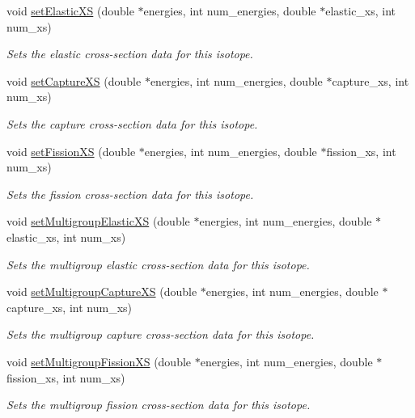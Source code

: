 \begin{DoxyCompactItemize}
void \hyperlink{classIsotope_a7916d1aa6ff21cdc92bf7d50fe007ab3}{set\-Elastic\-X\-S} (double $\ast$energies, int num\-\_\-energies, double $\ast$elastic\-\_\-xs, int num\-\_\-xs)
\begin{DoxyCompactList}\small\item\em Sets the elastic cross-\/section data for this isotope. \end{DoxyCompactList}\item 
void \hyperlink{classIsotope_ababa83f3f6499084769e5cc4dbb34746}{set\-Capture\-X\-S} (double $\ast$energies, int num\-\_\-energies, double $\ast$capture\-\_\-xs, int num\-\_\-xs)
\begin{DoxyCompactList}\small\item\em Sets the capture cross-\/section data for this isotope. \end{DoxyCompactList}\item 
void \hyperlink{classIsotope_ac8268351aeb8d8d321935386fbfae45b}{set\-Fission\-X\-S} (double $\ast$energies, int num\-\_\-energies, double $\ast$fission\-\_\-xs, int num\-\_\-xs)
\begin{DoxyCompactList}\small\item\em Sets the fission cross-\/section data for this isotope. \end{DoxyCompactList}\item 
void \hyperlink{classIsotope_a9e6a5d6c881814415769038b288189cc}{set\-Multigroup\-Elastic\-X\-S} (double $\ast$energies, int num\-\_\-energies, double $\ast$elastic\-\_\-xs, int num\-\_\-xs)
\begin{DoxyCompactList}\small\item\em Sets the multigroup elastic cross-\/section data for this isotope. \end{DoxyCompactList}\item 
void \hyperlink{classIsotope_ab1938f4ecfa23a73ab995626a28b9393}{set\-Multigroup\-Capture\-X\-S} (double $\ast$energies, int num\-\_\-energies, double $\ast$capture\-\_\-xs, int num\-\_\-xs)
\begin{DoxyCompactList}\small\item\em Sets the multigroup capture cross-\/section data for this isotope. \end{DoxyCompactList}\item 
void \hyperlink{classIsotope_ae642cf07eaeeb65ddddbb91f00b5b4d7}{set\-Multigroup\-Fission\-X\-S} (double $\ast$energies, int num\-\_\-energies, double $\ast$fission\-\_\-xs, int num\-\_\-xs)
\begin{DoxyCompactList}\small\item\em Sets the multigroup fission cross-\/section data for this isotope. \end{DoxyCompactList}\item 

\end{DoxyCompactItemize}
